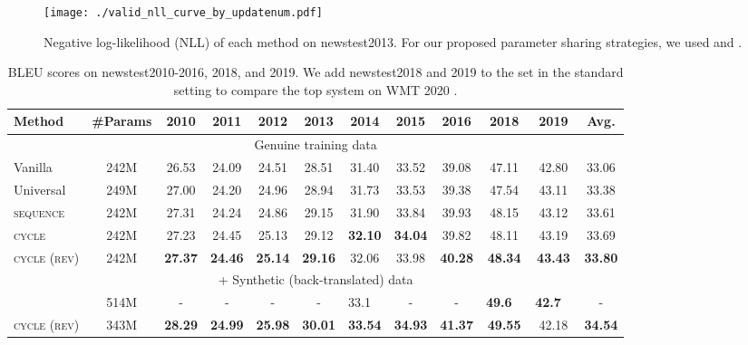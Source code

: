 \documentclass[11pt]{article}
\begin{document}
\begin{figure}[!t]
  \centering 
  \texttt{[image: ./valid\_nll\_curve\_by\_updatenum.pdf]}
   \caption{Negative log-likelihood (NLL) of each method on newstest2013. For our proposed parameter sharing strategies, we used  and .}
   \label{fig:valid_nll_by_time}
\end{figure}


\begin{table*}[!t]
  \centering{}
  \footnotesize
  \begin{tabular}{ l | c | c c c c c c c c c | c } \hline
  Method & \#Params & 2010 & 2011 & 2012 & 2013 & 2014 & 2015 & 2016 & 2018 & 2019 & Avg. \\ \hline \hline
  \multicolumn{12}{c}{Genuine training data} \\ \hline \hline
  Vanilla & 242M & 26.53 & 24.09 & 24.51 & 28.51 & 31.40 & 33.52 & 39.08 & 47.11 & 42.80 & 33.06 \\
  Universal & 249M & 27.00 & 24.20 & 24.96 & 28.94 & 31.73 & 33.53 & 39.38 & 47.54 & 43.11 & 33.38 \\
  \textsc{sequence} & 242M & 27.31 & 24.24 & 24.86 & 29.15 & 31.90 & 33.84 & 39.93 & 48.15 & 43.12 & 33.61 \\
  \textsc{cycle} & 242M & 27.23 & 24.45 & 25.13 & 29.12 & \textbf{32.10} & \textbf{34.04} & 39.82 & 48.11 & 43.19 & 33.69 \\
  \textsc{cycle (rev)} & 242M & \textbf{27.37} & \textbf{24.46} & \textbf{25.14} & \textbf{29.16} & 32.06 & 33.98 & \textbf{40.28} & \textbf{48.34} & \textbf{43.43} & \textbf{33.80} \\ \hline \hline
  \multicolumn{12}{c}{+ Synthetic (back-translated) data} \\ \hline \hline
  \citet{kiyono-etal-2020-tohoku} & 514M & - & - & - & - & 33.1 \  & - & - & \textbf{49.6} \  & \textbf{42.7} \ & - \\
  \textsc{cycle (rev)} & 343M & \textbf{28.29} & \textbf{24.99} & \textbf{25.98} & \textbf{30.01} & \textbf{33.54} & \textbf{34.93} & \textbf{41.37} & \textbf{49.55} & 42.18 & \textbf{34.54} \\ \hline
  \end{tabular}
  \caption{BLEU scores on newstest2010-2016, 2018, and 2019. We add newstest2018 and 2019 to the set in the standard setting to compare the top system on WMT 2020 \cite{kiyono-etal-2020-tohoku}.\label{tab:exp_wmt2020_result}}
\end{table*}
\end{document}
